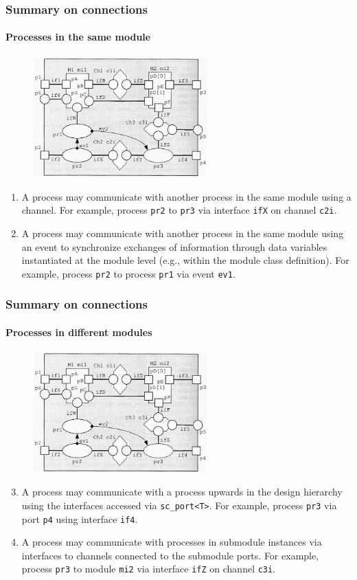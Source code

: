 \begin{frame}
\frametitle{Summary on connections}
\framesubtitle{Processes in the same module}

\begin{figure}
\includegraphics[width=0.6\textwidth]{lecture12/img/connections.png}
\end{figure}
{\scriptsize
\begin{enumerate}
\item A process may communicate with another process in the same module using a channel. For example, process \texttt{pr2} to \texttt{pr3} via interface \texttt{ifX} on channel \texttt{c2i}.
\item A process may communicate with another process in the same module using an event to synchronize exchanges of information through data variables instantiated at the module level (e.g., within
the module class definition). For example, process \texttt{pr2} to process \texttt{pr1} via event \texttt{ev1}.
\end{enumerate}
}
\end{frame}

\begin{frame}
\frametitle{Summary on connections}
\framesubtitle{Processes in different modules}

\begin{figure}
\includegraphics[width=0.6\textwidth]{lecture12/img/connections.png}
\end{figure}
{\scriptsize
\begin{enumerate}
\setcounter{enumi}{2}
\item A process may communicate with a process upwards in the design hierarchy using the interfaces accessed via \texttt{sc\_port<T>}. For example, process \texttt{pr3} via port \texttt{p4} using interface \texttt{if4}.
\item A process may communicate with processes in submodule instances via interfaces to channels connected to the submodule ports. For example, process \texttt{pr3} to module \texttt{mi2} via interface \texttt{ifZ} on channel \texttt{c3i}.
\end{enumerate}
}
\end{frame}

